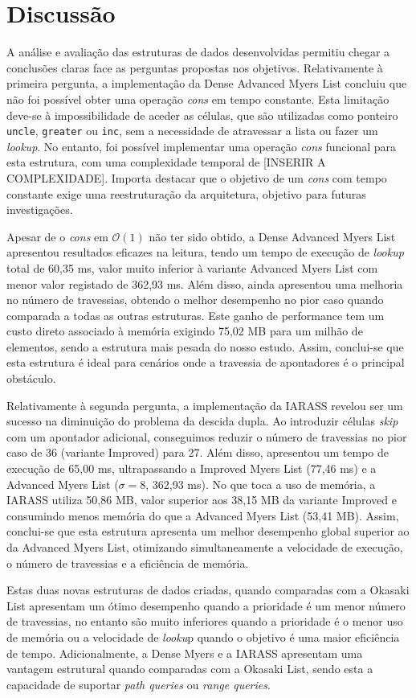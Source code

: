 \section{Discussão}

A análise e avaliação das estruturas de dados desenvolvidas permitiu chegar a conclusões claras face as perguntas propostas nos objetivos.
Relativamente à primeira pergunta, a implementação da Dense Advanced Myers List concluiu que não foi possível obter uma operação \textit{cons} em
tempo constante. Esta limitação deve-se à impossibilidade de aceder as células, que são utilizadas como ponteiro \texttt{uncle},
\texttt{greater} ou \texttt{inc}, sem a necessidade de atravessar a lista ou fazer um \textit{lookup}. No entanto, foi possível implementar uma operação \textit{cons} funcional 
para esta estrutura, com uma complexidade temporal de [INSERIR A COMPLEXIDADE]. Importa destacar que o objetivo de um \textit{cons} com tempo constante 
exige uma reestruturação da arquitetura, objetivo para futuras investigações.

Apesar de o \textit{cons} em $\mathcal{O}(1)$ não ter sido obtido, a Dense Advanced Myers List apresentou resultados eficazes na leitura, tendo um tempo de execução
de \textit{lookup} total de 60,35 ms, valor muito inferior à variante Advanced Myers List com menor valor registado de 362,93 ms. Além disso, ainda apresentou uma melhoria no 
número de travessias, obtendo o melhor desempenho no pior caso quando comparada a todas as outras estruturas. Este ganho de performance tem um 
custo direto associado à memória exigindo 75,02 MB para um milhão de elementos, sendo a estrutura mais pesada do nosso estudo. Assim, conclui-se 
que esta estrutura é ideal para cenários onde a travessia de apontadores é o principal obstáculo.

Relativamente à segunda pergunta, a implementação da IARASS revelou ser um sucesso na diminuição do problema da descida dupla. Ao introduzir células 
\textit{skip} com um apontador adicional, conseguimos reduzir o número de travessias no pior caso de 36 (variante Improved) para 27. Além disso, apresentou um 
tempo de execução de 65,00 ms, ultrapassando a Improved Myers List (77,46 ms) e a Advanced Myers List ($\sigma = 8$, 362,93 ms). No que toca a uso de memória, a 
IARASS utiliza 50,86 MB, valor superior aos 38,15 MB da variante Improved e consumindo menos memória do que a Advanced Myers List (53,41 MB). 
Assim, conclui-se que esta estrutura apresenta um melhor desempenho global superior ao da Advanced Myers List, otimizando simultaneamente a velocidade
de execução, o número de travessias e a eficiência de memória.

Estas duas novas estruturas de dados criadas, quando comparadas com a Okasaki List apresentam um ótimo desempenho quando a prioridade é um menor número de
travessias, no entanto são muito inferiores quando a prioridade é o menor uso de memória ou a velocidade de \textit{looku}p quando o objetivo é uma maior eficiência de tempo.
Adicionalmente, a Dense Myers e a IARASS apresentam uma vantagem estrutural quando comparadas com a Okasaki List, sendo esta a capacidade de suportar \textit{path queries} ou \textit{range queries}. 
